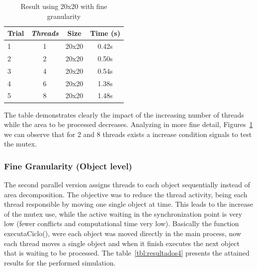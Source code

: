 \documentclass[10pt,a4paper,final]{report}
\begin{document}
\begin{table}[H]
  \begin{center}
     \begin{tabular}{ | l | c | c | c |}
      \hline
      \textbf{Trial} & \textbf{\textit{Threads}} & \textbf{Size} & \textbf{Time (s)}\\ \hline
      1 & 1 & 20x20 & 0.42s \\ \hline
      2 & 2 & 20x20 & 0.50s \\ \hline
      3 & 4 & 20x20 & 0.54s  \\ \hline
      4 & 6 & 20x20 & 1.38s \\ \hline
      5 & 8 & 20x20 & 1.48s \\ \hline
      
  \end{tabular}
  \caption{Result using 20x20 with fine granularity}
  \label{tbl:resultados3}
  \end{center}
\end{table}

The table demonstrates clearly the impact of the increasing number of threads while the area to be processed decreases. Analyzing in more fine detail, Figures~\ref{fig_lock_88} we can observe that for 2 and 8 threads exists a increase condition signals to test the mutex.



\begin{figure}[H]
      \label{fig_lock_88}
\end{figure}



\subsubsection{Fine Granularity (Object level)}
The second parallel version assigns threads to each object sequentially instead of area decomposition.
The objective was to reduce the thread activity, being each thread responsible by moving one single object at time. This leads to the increase of the mutex use, while the active waiting in the synchronization point is very low (fewer conflicts and computational time very low). Basically the function executaCiclo(), were each object was moved directly in the main process, now each thread moves a single object and when it finish executes the next object that is waiting to be processed.
The table~\ref{tbl:resultados4} presents the attained results for the performed simulation.
\end{document}
